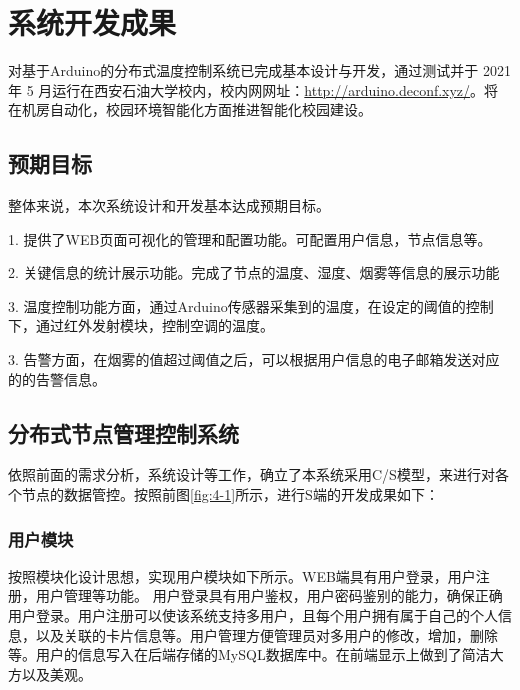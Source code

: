 \section{系统开发成果}

对基于Arduino的分布式温度控制系统已完成基本设计与开发，通过测试并于 2021 年 5 月运行在西安石油大学校内，校内网网址：\underline{http://arduino.deconf.xyz/}。将在机房自动化，校园环境智能化方面推进智能化校园建设。

\subsection{预期目标}

整体来说，本次系统设计和开发基本达成预期目标。

1. 提供了WEB页面可视化的管理和配置功能。可配置用户信息，节点信息等。

2. 关键信息的统计展示功能。完成了节点的温度、湿度、烟雾等信息的展示功能

3. 温度控制功能方面，通过Arduino传感器采集到的温度，在设定的阈值的控制下，通过红外发射模块，控制空调的温度。

3. 告警方面，在烟雾的值超过阈值之后，可以根据用户信息的电子邮箱发送对应的的告警信息。

\subsection{分布式节点管理控制系统}

依照前面的需求分析，系统设计等工作，确立了本系统采用C/S模型，来进行对各个节点的数据管控。按照前图\ref{fig:4-1}所示，进行S端的开发成果如下：

\subsubsection{用户模块}
按照模块化设计思想，实现用户模块如下所示。WEB端具有用户登录，用户注册，用户管理等功能。
用户登录具有用户鉴权，用户密码鉴别的能力，确保正确用户登录。用户注册可以使该系统支持多用户，且每个用户拥有属于自己的个人信息，以及关联的卡片信息等。用户管理方便管理员对多用户的修改，增加，删除等。用户的信息写入在后端存储的MySQL数据库中。在前端显示上做到了简洁大方以及美观。

